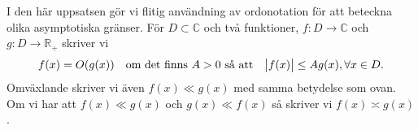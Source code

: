 I den här uppsatsen gör vi flitig användning av ordonotation för att beteckna olika asymptotiska gränser. För $D \subset \mathbb{C}$ och två funktioner, $f: D \to \mathbb{C}$ och $g: D \to \mathbb{R}_+$ skriver vi
\begin{align*}
    f(x) = O(g(x)) \quad \text{om det finns } A > 0 \text{ så att} \quad \abs{f(x)} \leq A g(x), \forall x \in D.
\end{align*}
Omväxlande skriver vi även \(f(x) \ll g(x)\) med samma betydelse som ovan. Om vi har att \(f(x) \ll g(x)\) och \(g(x) \ll f(x)\) så skriver vi \(f(x) \asymp g(x)\).